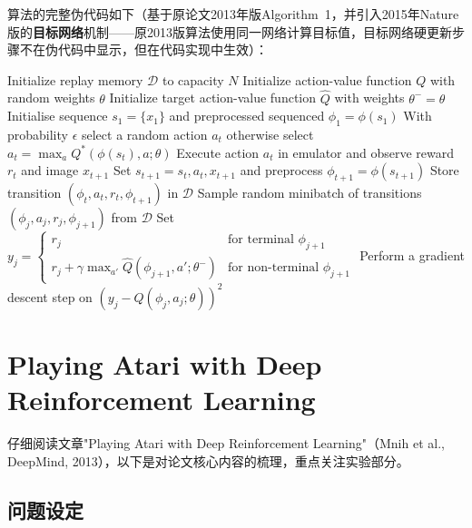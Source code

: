 \documentclass{article}
\begin{document}
\medskip
算法的完整伪代码如下（基于原论文2013年版Algorithm~1，并引入2015年Nature版的\textbf{目标网络}机制——原2013版算法使用同一网络计算目标值，目标网络硬更新步骤不在伪代码中显示，但在代码实现中生效）：

\begin{algorithm}[H]
\caption{Deep Q-learning with Experience Replay}
\begin{algorithmic}[1]
\State Initialize replay memory $\mathcal{D}$ to capacity $N$
\State Initialize action-value function $Q$ with random weights $\theta$
\State Initialize target action-value function $\hat{Q}$ with weights $\theta^- = \theta$
    \State Initialise sequence $s_1 = \{x_1\}$ and preprocessed sequenced $\phi_1 = \phi(s_1)$
        \State With probability $\epsilon$ select a random action $a_t$
        \State otherwise select $a_t = \max_a Q^*(\phi(s_t), a; \theta)$
        \State Execute action $a_t$ in emulator and observe reward $r_t$ and image $x_{t+1}$
        \State Set $s_{t+1} = s_t, a_t, x_{t+1}$ and preprocess $\phi_{t+1} = \phi(s_{t+1})$
        \State Store transition $(\phi_t, a_t, r_t, \phi_{t+1})$ in $\mathcal{D}$
        \State Sample random minibatch of transitions $(\phi_j, a_j, r_j, \phi_{j+1})$ from $\mathcal{D}$
        \State Set $y_j =
            \begin{cases}
              r_j & \text{for terminal } \phi_{j+1}\\
              r_j + \gamma \max_{a'} \hat{Q}(\phi_{j+1}, a'; \theta^-) & \text{for non-terminal } \phi_{j+1}
            \end{cases}$
        \State Perform a gradient descent step on $\left(y_j - Q(\phi_j, a_j; \theta)\right)^2$
    \EndFor
\EndFor
\end{algorithmic}
\end{algorithm}


\section{Playing Atari with Deep Reinforcement Learning}

仔细阅读文章"Playing Atari with Deep Reinforcement Learning"（Mnih et al., DeepMind, 2013），以下是对论文核心内容的梳理，重点关注实验部分。

\subsection{问题设定}
\end{document}

